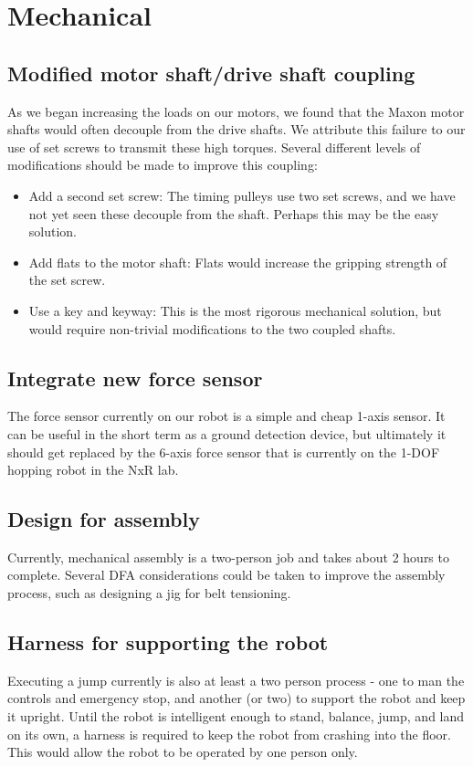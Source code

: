 \documentclass{report}
\begin{document}
\section[Mechanical]{Mechanical}
\subsection[Modified motor shaft/drive shaft coupling]{Modified motor shaft/drive shaft coupling}
As we began increasing the loads on our motors, we found that the Maxon motor shafts would often decouple from the drive shafts. We attribute this failure to our use of set screws to transmit these high torques. Several different levels of modifications should be made to improve this coupling:
\begin{itemize}
\item Add a second set screw: The timing pulleys use two set screws, and we have not yet seen these decouple from the shaft. Perhaps this may be the easy solution.
\item Add flats to the motor shaft: Flats would increase the gripping strength of the set screw.
\item Use a key and keyway: This is the most rigorous mechanical solution, but would require non-trivial modifications to the two coupled shafts.
\end{itemize}
\subsection[Integrate new force sensor]{Integrate new force sensor}
The force sensor currently on our robot is a simple and cheap 1-axis sensor. It can be useful in the short term as a ground detection device, but ultimately it should get replaced by the 6-axis force sensor that is currently on the 1-DOF hopping robot in the NxR lab.

\subsection[Design for assembly]{Design for assembly}
Currently, mechanical assembly is a two-person job and takes about 2 hours to complete. Several DFA considerations could be taken to improve the assembly process, such as designing a jig for belt tensioning.

\subsection[Harness for supporting the robot]{Harness for supporting the robot}
Executing a jump currently is also at least a two person process - one to man the controls and emergency stop, and another (or two) to support the robot and keep it upright. Until the robot is intelligent enough to stand, balance, jump, and land on its own, a harness is required to keep the robot from crashing into the floor. This would allow the robot to be operated by one person only.
\end{document}
